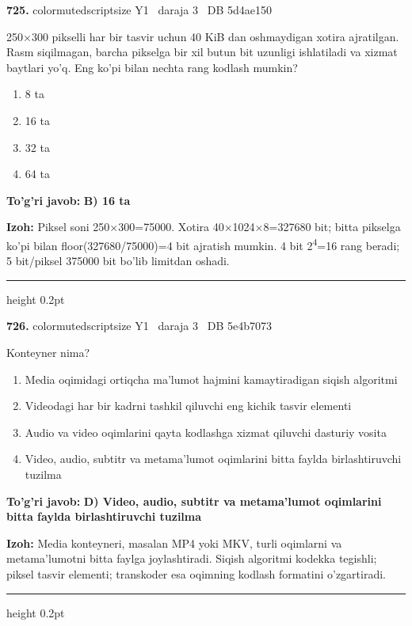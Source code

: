 \documentclass[10pt,a4paper,oneside]{article}
\begin{document}
\noindent\textbf{\color{ink}725.}  {color{muted}scriptsize Y1 \textbullet\ daraja 3 \textbullet\ DB 5d4ae150}
\par
250\ensuremath{\times}300 pikselli har bir tasvir uchun 40 KiB dan oshmaydigan xotira ajratilgan. Rasm siqilmagan, barcha pikselga bir xil butun bit uzunligi ishlatiladi va xizmat baytlari yo'q. Eng ko'pi bilan nechta rang kodlash mumkin?
\begin{enumerate}[label=\Alph*),leftmargin=9mm]
\item 8 ta
\item 16 ta
\item 32 ta
\item 64 ta
\end{enumerate}
\begin{tcolorbox}[enhanced,breakable,colback=teal!4,colframe=teal!50!black,boxrule=0.5pt,arc=1.1mm,left=3mm,right=3mm,top=1.7mm,bottom=1.7mm,before skip=2mm,after skip=2mm]
\textbf{\color{teal}To'g'ri javob:} \textbf{B) 16 ta}
\par\smallskip
\textbf{Izoh:} Piksel soni 250\ensuremath{\times}300=75000. Xotira 40\ensuremath{\times}1024\ensuremath{\times}8=327680 bit; bitta pikselga ko'pi bilan floor(327680/75000)=4 bit ajratish mumkin. 4 bit 2\textsuperscript{4}=16 rang beradi; 5 bit/piksel 375000 bit bo'lib limitdan oshadi.
\end{tcolorbox}
\vspace{2mm}\hrule height 0.2pt \vspace{3mm}

\noindent\textbf{\color{ink}726.}  {color{muted}scriptsize Y1 \textbullet\ daraja 3 \textbullet\ DB 5e4b7073}
\par
Konteyner nima?
\begin{enumerate}[label=\Alph*),leftmargin=9mm]
\item Media oqimidagi ortiqcha ma'lumot hajmini kamaytiradigan siqish algoritmi
\item Videodagi har bir kadrni tashkil qiluvchi eng kichik tasvir elementi
\item Audio va video oqimlarini qayta kodlashga xizmat qiluvchi dasturiy vosita
\item Video, audio, subtitr va metama'lumot oqimlarini bitta faylda birlashtiruvchi tuzilma
\end{enumerate}
\begin{tcolorbox}[enhanced,breakable,colback=teal!4,colframe=teal!50!black,boxrule=0.5pt,arc=1.1mm,left=3mm,right=3mm,top=1.7mm,bottom=1.7mm,before skip=2mm,after skip=2mm]
\textbf{\color{teal}To'g'ri javob:} \textbf{D) Video, audio, subtitr va metama'lumot oqimlarini bitta faylda birlashtiruvchi tuzilma}
\par\smallskip
\textbf{Izoh:} Media konteyneri, masalan MP4 yoki MKV, turli oqimlarni va metama'lumotni bitta faylga joylashtiradi. Siqish algoritmi kodekka tegishli; piksel tasvir elementi; transkoder esa oqimning kodlash formatini o'zgartiradi.
\end{tcolorbox}
\vspace{2mm}\hrule height 0.2pt \vspace{3mm}
\end{document}
